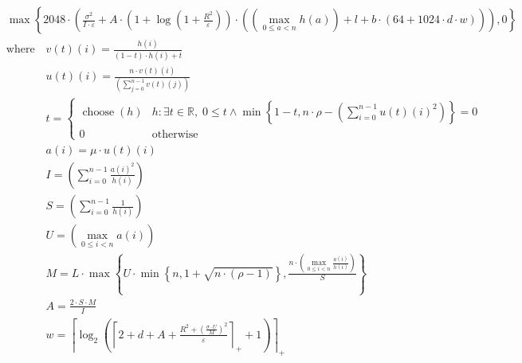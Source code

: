 \[\begin{aligned} &\max\left\{ 2048 \cdot \left(\frac{\sigma^{2}}{I \cdot \varepsilon} + A \cdot \left(1 + \log\left(1 + \frac{R^{2}}{\varepsilon}\right)\right) \cdot \left(\left(\max_{0\le a<n} h\left(a\right)\right) + l + b \cdot \left(64 + 1024 \cdot d \cdot w\right)\right)\right), 0 \right\} \\ &\text{where}\quad v\left(t\right)\left(i\right) = \frac{h\left(i\right)}{\left(1 - t\right) \cdot h\left(i\right) + t} \\ &\phantom{\text{where}\quad} u\left(t\right)\left(i\right) = \frac{n \cdot v\left(t\right)\left(i\right)}{\left(\sum_{j=0}^{n-1} v\left(t\right)\left(j\right)\right)} \\ &\phantom{\text{where}\quad} t = \begin{cases} \operatorname{choose}\left(h\right) & h : \exists t\in \mathbb{R},\;0 \leq t \land \min\left\{ 1 - t, n \cdot \rho - \left(\sum_{i=0}^{n-1} u\left(t\right)\left(i\right)^{2}\right) \right\} = 0 \\ 0 & \mathrm{otherwise} \end{cases} \\ &\phantom{\text{where}\quad} a\left(i\right) = \mu \cdot u\left(t\right)\left(i\right) \\ &\phantom{\text{where}\quad} I = \left(\sum_{i=0}^{n-1} \frac{a\left(i\right)^{2}}{h\left(i\right)}\right) \\ &\phantom{\text{where}\quad} S = \left(\sum_{i=0}^{n-1} \frac{1}{h\left(i\right)}\right) \\ &\phantom{\text{where}\quad} U = \left(\max_{0\le i<n} a\left(i\right)\right) \\ &\phantom{\text{where}\quad} M = L \cdot \max\left\{ U \cdot \min\left\{ n, 1 + \sqrt{n \cdot \left(\rho - 1\right)} \right\}, \frac{n \cdot \left(\max_{0\le i<n} \frac{a\left(i\right)}{h\left(i\right)}\right)}{S} \right\} \\ &\phantom{\text{where}\quad} A = \frac{2 \cdot S \cdot M}{I} \\ &\phantom{\text{where}\quad} w = \left\lceil\log_{2}\left(\left\lceil 2 + d + A + \frac{R^{2} + \left(\frac{\sigma \cdot U}{M}\right)^{2}}{\varepsilon} \right\rceil_{+} + 1\right)\right\rceil_{+}\end{aligned}\]
